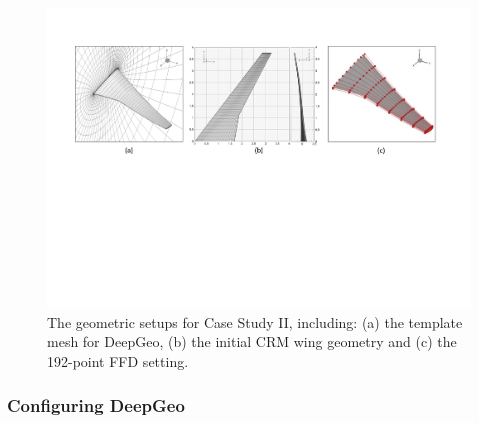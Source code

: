 \begin{figure}[!tb]
    \begin{center}
        \includegraphics[width=1\linewidth]{chapter5/fig/crm_template_mesh_initial_geometry.pdf}
    \end{center}
    \caption{
        \small The geometric setups for Case Study II, including: (a) the template mesh for DeepGeo, (b) the initial CRM wing geometry and (c) the 192-point FFD setting.
    }
    \label{ch5:fig:cs2_template_mesh}
\end{figure}



\subsubsection{Configuring DeepGeo}

